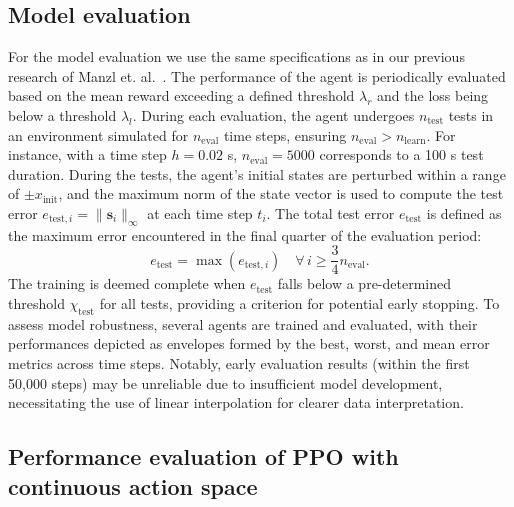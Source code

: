 \subsection{Model evaluation} \label{Model evaluation}

For the model evaluation we use the same specifications as in our previous research of Manzl et. al.~\cite{manzl2023relrl}. The performance of the agent is periodically evaluated based on the mean reward exceeding a defined threshold \( \lambda_r \) and the loss being below a threshold \( \lambda_l \). During each evaluation, the agent undergoes \( n_{\text{test}} \) tests in an environment simulated for \( n_{\text{eval}} \) time steps, ensuring \( n_{\text{eval}} > n_{\text{learn}} \). For instance, with a time step \( h = 0.02 \) s, \( n_{\text{eval}} = 5000 \) corresponds to a 100 s test duration. During the tests, the agent's initial states are perturbed within a range of \( \pm x_{\text{init}} \), and the maximum norm of the state vector is used to compute the test error \( e_{\text{test},i} = \|\mathbf{s}_i\|_{\infty} \) at each time step \( t_i \). The total test error \( e_{\text{test}} \) is defined as the maximum error encountered in the final quarter of the evaluation period:
\begin{equation}
	e_{\text{test}} = \max(e_{\text{test},i}) \quad \forall \, i \geq \frac{3}{4}n_{\text{eval}}.
\end{equation}
The training is deemed complete when \( e_{\text{test}} \) falls below a pre-determined threshold \( \chi_{\text{test}} \) for all tests, providing a criterion for potential early stopping. To assess model robustness, several agents are trained and evaluated, with their performances depicted as envelopes formed by the best, worst, and mean error metrics across time steps. Notably, early evaluation results (within the first 50,000 steps) may be unreliable due to insufficient model development, necessitating the use of linear interpolation for clearer data interpretation.

\subsection{Performance evaluation of PPO with continuous action space} \label{Performance Evaluation of PPO with Discrete and Continuous Action Spaces}

